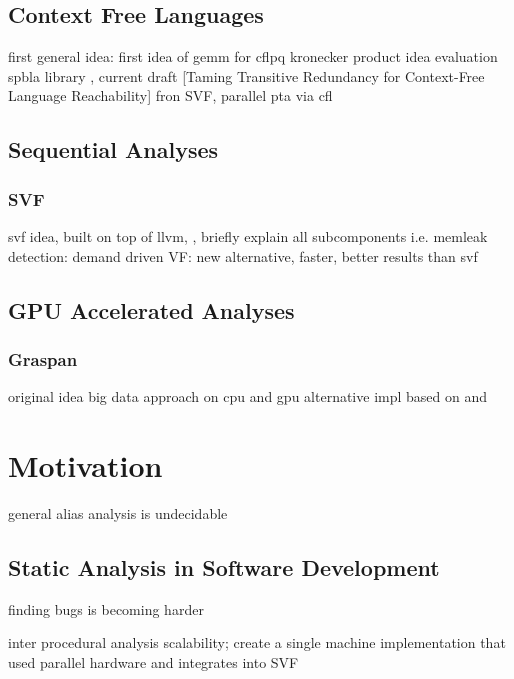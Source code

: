 \subsection{Context Free Languages}
first general idea: \autocite{reps1998program} first idea of gemm for cflpq \autocite{azimov2018context} kronecker product idea \autocite{orachev2020context} evaluation \autocite{mishin2019evaluation} spbla library \autocite{orachev2021spbla}, current draft [Taming Transitive Redundancy for Context-Free Language Reachability] fron SVF, parallel pta via cfl \autocite{su2014parallel}
\subsection{Sequential Analyses}
\subsubsection{SVF}
svf idea, built on top of llvm, \autocite{sui2016svf}, briefly explain all subcomponents i.e. memleak detection: \autocite{sui2014detecting} demand driven VF: \autocite{sui2018value} new alternative, faster, better results than svf \autocite{shi2018pinpoint}
\subsection{GPU Accelerated Analyses}
\subsubsection{Graspan}
original idea \autocite{zheng2008demand} big data approach on cpu \autocite{wang2017graspan} and gpu \autocite{zuo2021systemizing} alternative impl \autocite{gu2020towards} based on \autocite{mendez2012gpu} and \autocite{mendez2010parallel}
\section{Motivation}
general alias analysis is undecidable
\subsection{Static Analysis in Software Development}
finding bugs is becoming harder

inter procedural analysis scalability; create a single machine implementation that used parallel hardware and integrates into SVF


